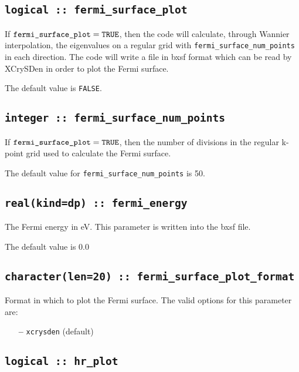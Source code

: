 \subsection[fermi\_surface\_plot]{\tt logical :: fermi\_surface\_plot}

If $\verb#fermi_surface_plot#=\verb#TRUE#$, then the code will calculate,
through Wannier interpolation, the
eigenvalues on a regular grid with \verb#fermi_surface_num_points# in
each direction. The code will write a file in bxsf format which can be
read by XCrySDen in order to plot the Fermi surface.

The default value is \verb#FALSE#.


\subsection[fermi\_surface\_num\_points]{\tt integer :: fermi\_surface\_num\_points}

If $\verb#fermi_surface_plot#=\verb#TRUE#$, then the number of divisions in
the regular k-point grid used to calculate the Fermi surface.

The default value for \verb#fermi_surface_num_points# is 50.


\subsection[fermi\_energy]{\tt real(kind=dp) :: fermi\_energy}
The Fermi energy in eV. This parameter is written into the bxsf file.


The default value is 0.0


\subsection[fermi\_surface\_plot\_format]{\tt character(len=20) ::
  fermi\_surface\_plot\_format} 

Format in which to plot the Fermi surface. 
The valid options for this parameter are:
\begin{itemize}
\item[{\bf --}] \verb#xcrysden#  (default)
\end{itemize}

\subsection[hr\_plot]{\tt logical :: hr\_plot}

